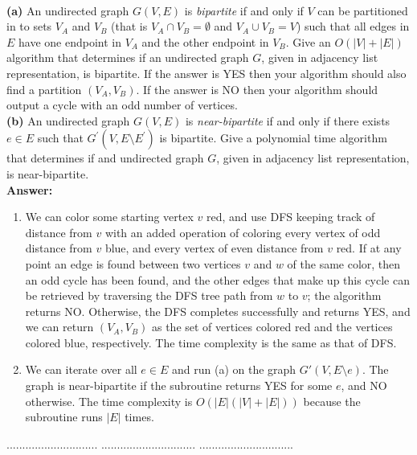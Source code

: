 \documentclass[a4paper,11pt]{article}
\begin{document}
\\
{\bf (a)} An undirected graph $G(V,E)$ is {\em bipartite} if and only if $V$ can be partitioned in to sets $V_A$ and $V_B$
(that is $V_A \cap V_B=\emptyset$ and $V_A \cup V_B = V$) such that all edges in $E$ have one endpoint in $V_A$ and the other endpoint in $V_B$.
Give an $O(|V|+|E|)$ algorithm that determines if an undirected graph $G$, given in adjacency list representation,  is bipartite. 
If the answer is YES then your algorithm should also find a partition $(V_A , V_B)$. 
If the answer is NO then your algorithm should output a cycle with an odd number of vertices.\\
{\bf (b)} An undirected graph $G(V,E)$ is {\em near-bipartite} if and only if there exists $e \in E$ such that 
$G^\prime ( V , E\setminus E^\prime ) $ is bipartite. Give a polynomial time algorithm that determines if
and undirected graph $G$, given in adjacency list representation, is near-bipartite.\\
{\bf Answer:}
\begin{enumerate}[label=(\alph*)]
    \item
        We can color some starting vertex $v$ red, and use DFS keeping track of distance from $v$ with an added operation of coloring every vertex of odd distance from $v$ blue, and every vertex of even distance from $v$ red. If at any point an edge is found between two vertices $v$ and $w$ of the same color, then an odd cycle has been found, and the other edges that make up this cycle can be retrieved by traversing the DFS tree path from $w$ to $v$; the algorithm returns NO. Otherwise, the DFS completes successfully and returns YES, and we can return $(V_A, V_B)$ as the set of vertices colored red and the vertices colored blue, respectively. The time complexity is the same as that of DFS.

    \item
        We can iterate over all $e \in E$ and run (a) on the graph $G'(V, E \setminus e)$. The graph is near-bipartite if the subroutine returns YES for some $e$, and NO otherwise. The time complexity is $O(|E|(|V| + |E|))$ because the subroutine runs $|E|$ times.
\end{enumerate}

\pagebreak

 $.............................$
 $..............................$
          $..............................$\\
\end{document}

